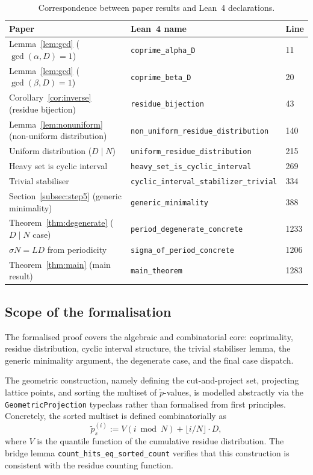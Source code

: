 \documentclass[11pt]{article}
\theoremstyle{plain}
\theoremstyle{definition}
\theoremstyle{remark}
\begin{document}
\begin{table}[ht]
\centering
\small
\begin{tabular}{lll}
\hline
\textbf{Paper} & \textbf{Lean~4 name} & \textbf{Line} \\
\hline
Lemma~\ref{lem:gcd} (\(\gcd(\alpha,D)=1\))
  & \texttt{coprime\_alpha\_D} & 11 \\
Lemma~\ref{lem:gcd} (\(\gcd(\beta,D)=1\))
  & \texttt{coprime\_beta\_D} & 20 \\
Corollary~\ref{cor:inverse} (residue bijection)
  & \texttt{residue\_bijection} & 43 \\
Lemma~\ref{lem:nonuniform} (non-uniform distribution)
  & \texttt{non\_uniform\_residue\_distribution} & 140 \\
Uniform distribution (\(D \mid N\))
  & \texttt{uniform\_residue\_distribution} & 215 \\
Heavy set is cyclic interval
  & \texttt{heavy\_set\_is\_cyclic\_interval} & 269 \\
Trivial stabiliser
  & \texttt{cyclic\_interval\_stabilizer\_trivial} & 334 \\
Section~\ref{subsec:step5} (generic minimality)
  & \texttt{generic\_minimality} & 388 \\
Theorem~\ref{thm:degenerate} (\(D \mid N\) case)
  & \texttt{period\_degenerate\_concrete} & 1233 \\
\(\sigma N = LD\) from periodicity
  & \texttt{sigma\_of\_period\_concrete} & 1206 \\
Theorem~\ref{thm:main} (main result)
  & \texttt{main\_theorem} & 1283 \\
\hline
\end{tabular}
\caption{Correspondence between paper results and Lean~4 declarations.}
\label{tab:lean}
\end{table}

\subsection{Scope of the formalisation}\label{subsec:lean_scope}

The formalised proof covers the algebraic and combinatorial core:
coprimality, residue distribution, cyclic interval structure, the trivial
stabiliser lemma, the generic minimality argument, the degenerate case, and
the final case dispatch.

The geometric construction, namely defining the cut-and-project set,
projecting lattice points, and sorting the multiset of \(\tilde{p}\)-values,
is modelled abstractly via the \texttt{GeometricProjection} typeclass rather
than formalised from first principles.  Concretely, the sorted multiset is
defined combinatorially as
\[
    \tilde{p}^{(i)}_s := V(i \bmod N) + \lfloor i/N \rfloor \cdot D,
\]
where \(V\) is the quantile function of the cumulative residue distribution.
The bridge lemma \texttt{count\_hits\_eq\_sorted\_count} verifies that this
construction is consistent with the residue counting function.
\end{document}

